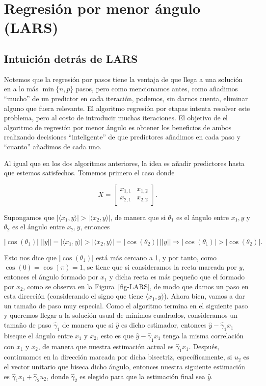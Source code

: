 \documentclass[
  letterpaper,
  DIV=11,
  numbers=noendperiod]{scrreprt}
\author{}
\date{}
\theoremstyle{definition}
\theoremstyle{plain}
\theoremstyle{remark}
\begin{document}
\chapter{Regresión por menor ángulo
(LARS)}\label{regresiuxf3n-por-menor-uxe1ngulo-lars}

\section{Intuición detrás de LARS}\label{intuiciuxf3n-detruxe1s-de-lars}

Notemos que la regresión por pasos tiene la ventaja de que llega a una
solución en a lo más \(\min\{n,p\}\) pasos, pero como mencionamos antes,
como añadimos ``mucho'' de un predictor en cada iteración, podemos, sin
darnos cuenta, eliminar alguno que fuera relevante. El algoritmo
regresión por etapas intenta resolver este problema, pero al costo de
introducir muchas iteraciones. El objetivo de el algoritmo de regresión
por menor ángulo es obtener los beneficios de ambos realizando
decisiones ``inteligente'' de que predictores añadimos en cada paso y
``cuanto'' añadimos de cada uno.

Al igual que en los dos algoritmos anteriores, la idea es añadir
predictores hasta que estemos satisfechos. Tomemos primero el caso donde

\[
X=\begin{bmatrix}
x_{1,1}&x_{1,2}\\
x_{2,1}&x_{2,2}
\end{bmatrix}.
\]

Supongamos que \(|\langle x_1,y\rangle|>|\langle x_2,y\rangle|\), de
manera que si \(\theta_1\) es el ángulo entre \(x_1, y\) y \(\theta_2\)
es el ángulo entre \(x_2,y\), entonces

\[
|\cos(\theta_1)|~||y||=|\langle x_1,y\rangle|>|\langle x_2,y\rangle|=|\cos(\theta_2)|~||y||\Rightarrow |\cos(\theta_1)|>|\cos(\theta_2)|.
\]

Esto nos dice que \(|\cos(\theta_1)|\) está más cercano a 1, y por
tanto, como \(\cos(0)=\cos(\pi)=1\), se tiene que si consideramos la
recta marcada por \(y\), entonces el ángulo formado por \(x_1\) y dicha
recta es más pequeño que el formado por \(x_2\), como se observa en la
Figura~\ref{fig-LARS}, de modo que damos un paso en esta dirección
(considerando el signo que tiene \(\langle x_1,y\rangle\)). Ahora bien,
vamos a dar un tamaño de paso muy especial. Como el algoritmo termina en
el siguiente paso y queremos llegar a la solución usual de mínimos
cuadrados, consideramos un tamaño de paso \(\hat\gamma_1\) de manera que
si \(\hat y\) es dicho estimador, entonces \(\hat y-\hat\gamma_1 x_1\)
biseque el ángulo entre \(x_1\) y \(x_2\), esto es que
\(\hat y-\hat\gamma_1 x_1\) tenga la misma correlación con \(x_1\) y
\(x_2\), de manera que nuestra estimación actual es
\(\hat\gamma_1 x_1\). Después, continuamos en la dirección marcada por
dicha bisectriz, específicamente, si \(u_2\) es el vector unitario que
biseca dicho ángulo, entonces nuestra siguiente estimación es
\(\hat\gamma_1 x_1+\hat\gamma_2 u_2\), donde \(\hat\gamma_2\) es elegido
para que la estimación final sea \(\hat y\).
\end{document}
